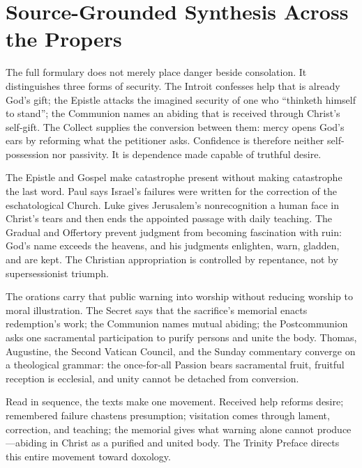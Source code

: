 \sectionguard
\label{triptych:brief-synthesis:next}
\section*{Source-Grounded Synthesis Across the Propers}

The full formulary does not merely place danger beside consolation. It
distinguishes three forms of security. The Introit confesses help that is
already God's gift; the Epistle attacks the imagined security of one who
``thinketh himself to stand''; the Communion names an abiding that is received
through Christ's self-gift. The Collect supplies the conversion between them:
mercy opens God's ears by reforming what the petitioner asks. Confidence is
therefore neither self-possession nor passivity. It is dependence made capable
of truthful desire.

The Epistle and Gospel make catastrophe present without making catastrophe the
last word. Paul says Israel's failures were written for the correction of the
eschatological Church. Luke gives Jerusalem's nonrecognition a human face in
Christ's tears and then ends the appointed passage with daily teaching. The
Gradual and Offertory prevent judgment from becoming fascination with ruin:
God's name exceeds the heavens, and his judgments enlighten, warn, gladden, and
are kept. The Christian appropriation is controlled by repentance, not by
supersessionist triumph.

The orations carry that public warning into worship without reducing worship
to moral illustration. The Secret says that the sacrifice's memorial enacts
redemption's work; the Communion names mutual abiding; the Postcommunion asks
one sacramental participation to purify persons and unite the body. Thomas,
Augustine, the Second Vatican Council, and the Sunday commentary converge on a
theological grammar: the once-for-all Passion bears sacramental fruit, fruitful reception
is ecclesial, and unity cannot be detached from conversion.

Read in sequence, the texts make one movement. Received help reforms desire; remembered failure chastens presumption; visitation comes through
lament, correction, and teaching; the memorial gives what warning alone cannot
produce—abiding in Christ as a purified and united body. The Trinity Preface
directs this entire movement toward doxology.

